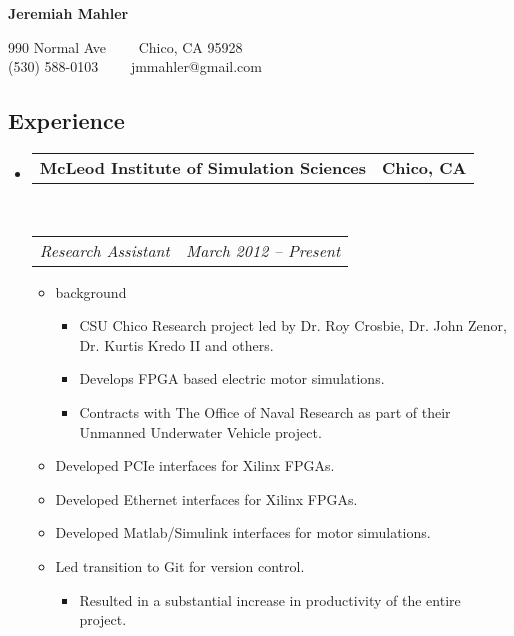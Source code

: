\documentclass[11pt,letterpaper]{article}
\makeatletter
\newcommand{\headerrow}[2]
{\begin{tabular*}{\linewidth}{l@{\extracolsep{\fill}}r}
	#1 &
	#2 \\
\end{tabular*}}
\makeatother
\begin{document}
\vspace*{0.5em}

\begin{center}
{\LARGE \textbf{Jeremiah Mahler}}

\vspace{0.2em}

990 Normal Ave\ \ \textbullet
\ \ Chico, CA 95928
\\
(530) 588-0103\ \ \textbullet
\ \ jmmahler@gmail.com
\end{center}

\vspace{0.5em}

\subsection*{Experience}

\begin{itemize}
	\parskip=0.1em

	\item
	\headerrow
		{\textbf{McLeod Institute of Simulation Sciences}}
		{\textbf{Chico, CA}}
	\\
	\headerrow
		{\emph{Research Assistant}}
		{\emph{March 2012 -- Present}}
	
	\begin{itemize}
		\item background
		\begin{itemize}
			\item CSU Chico Research project led by Dr. Roy Crosbie,
			Dr. John Zenor, Dr. Kurtis Kredo II and others.
			\item Develops FPGA based electric motor simulations.
			\item Contracts with The Office of Naval Research as part of
				their Unmanned Underwater Vehicle project.
		\end{itemize}

		\item Developed PCIe interfaces for Xilinx FPGAs.
		\item Developed Ethernet interfaces for Xilinx FPGAs.
		\item Developed Matlab/Simulink interfaces for motor simulations.
		\item Led transition to Git for version control.
			\begin{itemize}
			\item Resulted in a substantial increase in productivity of
					the entire project.
			\end{itemize}
	\end{itemize}
\end{itemize}
\end{document}
